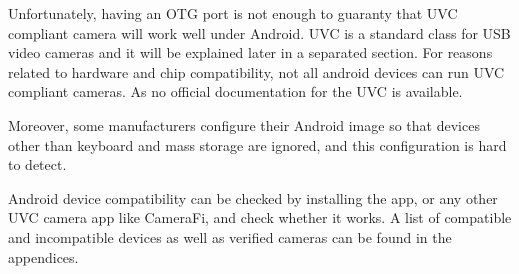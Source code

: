 Unfortunately, having an OTG port is not enough to guaranty that UVC compliant camera will work well under Android. UVC is a standard class for USB video cameras and it will be explained later in a separated section. For reasons related to hardware and chip compatibility, not all android devices can run UVC compliant cameras. As no official documentation for the UVC is available. 

Moreover, some manufacturers configure their Android image so that devices other than keyboard and mass storage are ignored, and this configuration is hard to detect. 

Android device compatibility can be checked by installing the app, or any other UVC camera app like CameraFi, and check whether it works. 
A list of compatible and incompatible devices as well as verified cameras can be found in the appendices.



